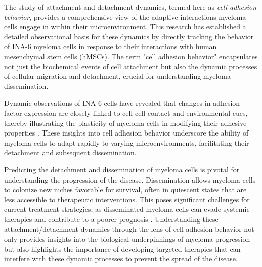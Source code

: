 
The study of attachment and detachment dynamics, termed here as \textit{cell
      adhesion behavior}, provides a comprehensive view of the adaptive interactions
myeloma cells engage in within their microenvironment. This research has
established a detailed observational basis for these dynamics by directly
tracking the behavior of INA-6 myeloma cells in response to their interactions
with human mesenchymal stem cells (hMSCs). The term "cell adhesion behavior"
encapsulates not just the biochemical events of cell attachment but also the
dynamic processes of cellular migration and detachment, crucial for
understanding myeloma dissemination.



Dynamic observations of INA-6 cells have revealed that changes in adhesion
factor expression are closely linked to cell-cell contact and environmental
cues, thereby illustrating the plasticity of myeloma cells in modifying their
adhesive properties \cite{huDevelopmentCellAdhesionbased2024,
      mrozikTherapeuticTargetingNcadherin2015}. These insights into cell adhesion
behavior underscore the ability of myeloma cells to adapt rapidly to varying
microenvironments, facilitating their detachment and subsequent dissemination.

Predicting the detachment and dissemination of myeloma cells is pivotal for
understanding the progression of the disease. Dissemination allows myeloma cells
to colonize new niches favorable for survival, often in quiescent states that
are less accessible to therapeutic interventions. This poses significant
challenges for current treatment strategies, as disseminated myeloma cells can
evade systemic therapies and contribute to a poorer prognosis
\cite{forsterMolecularImpactTumor2022,
      keatsClonalCompetitionAlternating2012}. Understanding these attachment/detachment
dynamics through the lens of cell adhesion behavior not only provides insights
into the biological underpinnings of myeloma progression but also highlights the
importance of developing targeted therapies that can interfere with these
dynamic processes to prevent the spread of the disease.

